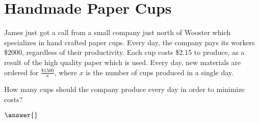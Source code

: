 \documentclass{ximera}
\begin{document}
\section{Handmade Paper Cups}
James just got a call from a small company just north of Wooster which specializes in hand crafted paper cups. Every day, the company pays its workers \$2000, regardless of their productivity. Each cup costs \$2.15 to produce, as a result of the high quality paper which is used. Every day, new materials are ordered for $\frac{\$1500}{x}$, where $x$ is the number of cups produced in a single day.
\begin{question}
How many cups should the company produce every day in order to minimize costs?

$\answer{}$
\end{question}
\pagebreak
\end{document}
